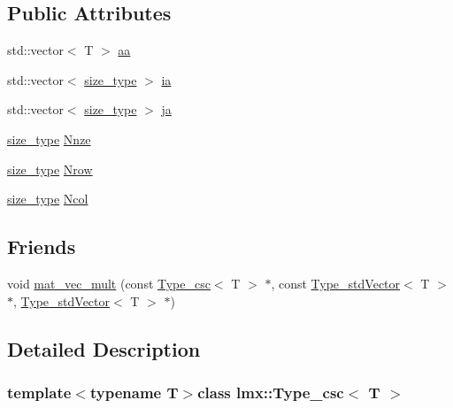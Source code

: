 \subsection*{Public Attributes}
\begin{DoxyCompactItemize}
\item 
std\-::vector$<$ T $>$ \hyperlink{classlmx_1_1Type__csc_a189ee6941a05a6e49f11e4ddee205ca6}{aa}
\item 
std\-::vector$<$ \hyperlink{lmx__mat__data_8h_a49b489a408a211a90e766329c0732d7b}{size\-\_\-type} $>$ \hyperlink{classlmx_1_1Type__csc_ad149a245b902861d26367af5a98d38c2}{ia}
\item 
std\-::vector$<$ \hyperlink{lmx__mat__data_8h_a49b489a408a211a90e766329c0732d7b}{size\-\_\-type} $>$ \hyperlink{classlmx_1_1Type__csc_a0fec1fc6c8a69fc5727063220d220eee}{ja}
\item 
\hyperlink{lmx__mat__data_8h_a49b489a408a211a90e766329c0732d7b}{size\-\_\-type} \hyperlink{classlmx_1_1Type__csc_ade9e149ea4925d6cc97727bbf07f080e}{Nnze}
\item 
\hyperlink{lmx__mat__data_8h_a49b489a408a211a90e766329c0732d7b}{size\-\_\-type} \hyperlink{classlmx_1_1Type__csc_a2c5ef8a3a2cd3a79d7b747f8cace105f}{Nrow}
\item 
\hyperlink{lmx__mat__data_8h_a49b489a408a211a90e766329c0732d7b}{size\-\_\-type} \hyperlink{classlmx_1_1Type__csc_ac201c80e090b62791f8a95d6f1e3b07c}{Ncol}
\end{DoxyCompactItemize}
\subsection*{Friends}
\begin{DoxyCompactItemize}
\item 
void \hyperlink{classlmx_1_1Type__csc_aaf433432afb39beb3a3908942731530e}{mat\-\_\-vec\-\_\-mult} (const \hyperlink{classlmx_1_1Type__csc}{Type\-\_\-csc}$<$ T $>$ $\ast$, const \hyperlink{classlmx_1_1Type__stdVector}{Type\-\_\-std\-Vector}$<$ T $>$ $\ast$, \hyperlink{classlmx_1_1Type__stdVector}{Type\-\_\-std\-Vector}$<$ T $>$ $\ast$)
\end{DoxyCompactItemize}


\subsection{Detailed Description}
\subsubsection*{template$<$typename T$>$class lmx\-::\-Type\-\_\-csc$<$ T $>$}

